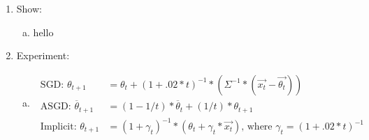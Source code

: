 \documentclass[paper=a4, fontsize=11pt]{scrartcl}
\begin{document}
\begin{enumerate}
  \item Show: \\
    \begin{enumerate}[(a)]
      \item hello
    \end{enumerate}
  \item Experiment: \\
    \begin{enumerate}[(a)]
      \item
        \begin{align*}
          \text{ SGD: } \theta_{t+1} &= \theta_t + (1 + .02*t)^{-1}*(\Sigma^{-1}*(\vec{x_t} - \vec{ \theta_t})) \\
          \text{ ASGD: } \overline{\theta}_{t+1} &= (1 - 1/t)*\overline{ \theta }_t + (1/t)*\theta_{t+1} \\
          \text{ Implicit: } \theta_{t+1} &= (1 + \gamma_t)^{-1}*(\theta_t + \gamma_t*\vec{x_t}) \text{, where } \gamma_t = (1 + .02*t)^{-1}
        \end{align*}
    \end{enumerate}
\end{enumerate}
\end{document}

